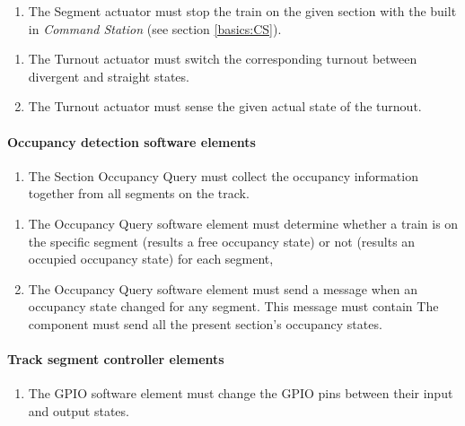 \begin{enumerate}[label=REQ-SA-\arabic*, leftmargin=*, format=\small]
	\item The Segment actuator must stop the train on the given section with the built in \textit{Command Station} (see section \ref{basics:CS}).
\end{enumerate}

\begin{enumerate}[label=REQ-TA-\arabic*, leftmargin=*, format=\small]
	\item The Turnout actuator must switch the corresponding turnout between divergent and straight states.
	\item The Turnout actuator must sense the given actual state of the turnout.
\end{enumerate}

\paragraph{Occupancy detection software elements}
\begin{enumerate}[label=REQ-SOQ-\arabic*, leftmargin=*, format=\small]
	\item The Section Occupancy Query must collect the occupancy information together from all segments on the track. \label{req:SOQ}
\end{enumerate}

\begin{enumerate}[label=REQ-OCQ-\arabic*, leftmargin=*, format=\small] 
	\item The Occupancy Query software element must determine whether a train is on the specific segment (results a free occupancy state) or not (results an occupied occupancy state) for each segment,  \label{req:OCQ-1}
	\item The Occupancy Query software element must send a message when an occupancy state changed for any segment. This message must contain The component must send all the present section's occupancy states. \label{req:OCQ-2}
\end{enumerate}

\paragraph{Track segment controller elements}
\begin{enumerate}[label=REQ-GPIO-\arabic*, leftmargin=*, format=\small] 
	\item The GPIO software element must change the GPIO pins between their input and output states. \label{req:GPIO}
\end{enumerate}

